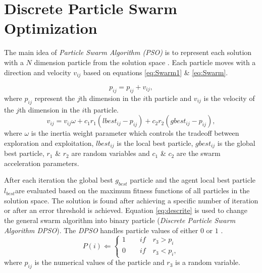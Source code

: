 \documentclass[preprint,10pt,5p,twocolumn]{elsarticle}
\begin{document}

\section{Discrete Particle Swarm Optimization}
\label{sec:ParticleSwarmAlgorithm}
 The main idea of \textit{Particle Swarm Algorithm (PSO)} is to represent each solution with a $N$ dimension particle from the solution space \cite{PSOFirst}. Each particle moves with a direction and velocity $v_{ij}$ based on equations \ref{eq:Swarm1} \& \ref{eq:Swarm}.

\begin{equation}
p_{ij}=p_{ij}+v_{ij},
\label{eq:Swarm1}
\end{equation}
where $p_{ij}$ represent the $j$th dimension in the $i$th particle and $v_{ij}$ is the velocity of the $j$th dimension in the $i$th particle.
 \begin{equation}
v_{ij}  = v_{ij} \omega + c_1 r_1 (lbest_{ij}  - p_{ij} ) + c_2 r_2 (gbest_{ij}  - p_{ij} ),
\label{eq:Swarm}
\end{equation}
 where $\omega$ is the inertia weight parameter which controls the tradeoff between exploration and exploitation,  $lbest_{ij}$ is the local best particle, $gbest_{ij}$ is the global best particle, $r_1$ \& $r_2$ are random variables and $c_1$ \& $c_2$ are the swarm acceleration parameters.

 After each iteration the global best $g_{best}$ particle and the agent local best particle $l_{best}$are evaluated based on the maximum fitness functions of all particles in the solution space. The solution is found after achieving a specific number of iteration or after an error threshold is achieved.
Equation \ref{eq:descrite} is used to change the general swarm algorithm into binary particle (\textit{Discrete Particle Swarm Algorithm DPSO}). The \textit{DPSO} handles particle values of either $0$ or $1$ \cite{PSODisceret}.  
\begin{equation}
   P(i)\Leftarrow 
\left \{
\begin{array}{c} 
1 \quad \quad if\quad r_{3}>p_{i}  \\

0 \quad \quad if\quad r_{3}<p_{i}, 
\label{eq:descrite}
\end{array}\right.
\end{equation}
 where $p_{ij}$ is the numerical values of the particle and $r_{3}$ is a random variable. 
\end{document}
